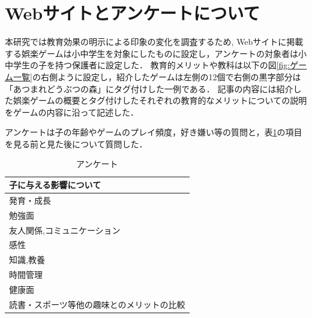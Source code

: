 \documentclass[twocolumn,10pt,a4j]{ltjsarticle}
\begin{document}
\section{Webサイトとアンケートについて}
本研究では教育効果の明示による印象の変化を調査するため, Webサイトに掲載する娯楽ゲームは小中学生を対象にしたものに設定し，アンケートの対象者は小中学生の子を持つ保護者に設定した．
教育的メリットや教科は以下の図\ref{fig:ゲーム一覧}の右側ように設定し，紹介したゲームは左側の12個で右側の黒字部分は「あつまれどうぶつの森」にタグ付けした一例である．
記事の内容には紹介した娯楽ゲームの概要とタグ付けしたそれぞれの教育的なメリットについての説明をゲームの内容に沿って記述した．

アンケートは子の年齢やゲームのプレイ頻度，好き嫌い等の質問と，表\ref{table:SpeedOfLight}の項目を見る前と見た後について質問した．

\vspace{1zh}
\begin{table}[h]
 \caption{アンケート}
 \label{table:SpeedOfLight}
 \centering
  \begin{tabular}{l}
  \hline
  子に与える影響について \\
   \hline \hline
   発育・成長 \\
   勉強面 \\
   友人関係,コミュニケーション \\
   感性 \\
   知識,教養   \\
   時間管理 \\
   健康面 \\
   読書・スポーツ等他の趣味とのメリットの比較 \\
   \hline
  \end{tabular}
\end{table}


\end{document}
